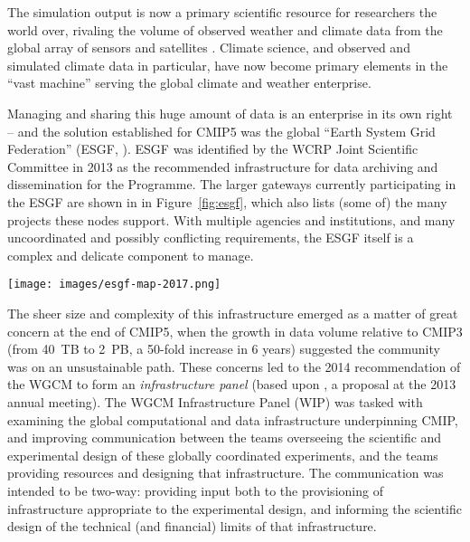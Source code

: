 \documentclass[gmd,manuscript]{copernicus}
\newcommand{\pipref}[1] {\citep{ref:#1}}
\newcommand{\figref}[1] {\mbox{Figure   \ref{fig:#1}}}
\begin{document}
The simulation output is now a primary scientific resource for
researchers the world over, rivaling the volume of observed weather
and climate data from the global array of sensors and satellites
\pipref{overpecketal2011}. Climate science, and observed and simulated
climate data in particular, have now become primary elements in the
``vast machine'' \pipref{edwards2010} serving the global climate and
weather enterprise.

Managing and sharing this huge amount of data is an enterprise in its
own right -- and the solution established for CMIP5 was the global
``Earth System Grid Federation'' (ESGF, \pipref{williamsetal2015}).
ESGF was identified by the WCRP Joint Scientific Committee in 2013 as
the recommended infrastructure for data archiving and dissemination
for the Programme. The larger gateways currently participating in the
ESGF are shown in in \figref{esgf}, which also lists (some of) the
many projects these nodes support. With multiple agencies and
institutions, and many uncoordinated and possibly conflicting
requirements, the ESGF itself is a complex and delicate component to
manage.

\begin{figure*}
  \begin{center}
    \texttt{[image: images/esgf-map-2017.png]}
  \end{center}
  \caption{Sites participating in the Earth System Grid Federation in
    2017. Figure courtesy Dean Williams, adapted from the ESGF
    Brochure. }
  \label{fig:esgf}
\end{figure*}

The sheer size and complexity of this infrastructure emerged as a
matter of great concern at the end of CMIP5, when the growth in data
volume relative to CMIP3 (from 40~TB to 2~PB, a 50-fold increase in 6
years) suggested the community was on an unsustainable path. These
concerns led to the 2014 recommendation of the WGCM to form an
\emph{infrastructure panel} (based upon \href{https://goo.gl/FHqbNN},
a proposal at the 2013 annual meeting). The WGCM Infrastructure Panel
(WIP) was tasked with examining the global computational and data
infrastructure underpinning CMIP, and improving communication between
the teams overseeing the scientific and experimental design of these
globally coordinated experiments, and the teams providing resources
and designing that infrastructure. The communication was intended to
be two-way: providing input both to the provisioning of infrastructure
appropriate to the experimental design, and informing the scientific
design of the technical (and financial) limits of that infrastructure.
\end{document}
